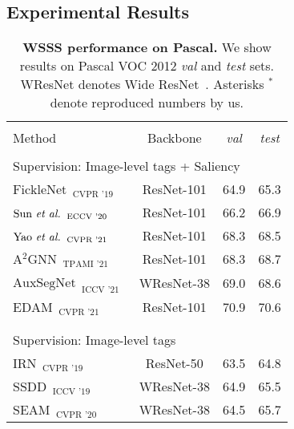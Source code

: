 \documentclass[10pt,twocolumn,letterpaper]{article}
\begin{document}
\subsection{Experimental Results}
\begin{table}[t]
\renewcommand{\arraystretch}{0.95}
\centering
  \caption{\textbf{WSSS performance on Pascal.} We show results on Pascal VOC 2012 \textit{val} and \textit{test} sets. WResNet denotes Wide ResNet~\cite{wu2019wider}. Asterisks $^*$ denote reproduced numbers by us.}\label{table_semantic}
\vspace{-0.7em}
\begin{threeparttable}
\begin{tabular}{l@{\hskip 0.1in}c@{\hskip 0.1in}cc}
    \Xhline{1pt}\\[-0.95em]
    Method  & Backbone& \textit{val} & \textit{test}\\
    \hline\hline 
    \\[-0.9em]
    
\multicolumn{3}{l}{Supervision: Image-level tags + Saliency}\\
$\text{FickleNet}_{\text{~~CVPR '19}}$~\cite{lee2019ficklenet}  & ResNet-101 & 64.9 & 65.3\\
$\text{Sun \textit{et al.}}_{\text{~~ECCV '20}}$~\cite{sun2020mining}   & ResNet-101  & 66.2  & 66.9  \\
$\text{Yao \textit{et al.}}_{\text{~~CVPR '21}}$~\cite{yao2021nonsalient}   & ResNet-101  & 68.3  & 68.5  \\
    $\text{A$^2$GNN}_{\text{~~TPAMI '21}}$~\cite{zhang2021affinity}   & ResNet-101  &   68.3 & 68.7\\
    $\text{AuxSegNet}_{\text{~~ICCV '21}}$~\cite{xu2021leveraging}    & WResNet-38 & 69.0  & 68.6 \\
$\text{EDAM}_{\text{~~CVPR '21}}$~\cite{wu2021embedded}    & ResNet-101 & 70.9  & 70.6 \\
\\[-0.9em]
\hline
    \\[-0.9em]
     \multicolumn{3}{l}{Supervision: Image-level tags}\\
    $\text{IRN}_{\text{~~CVPR '19}}$~\cite{ahn2019weakly}  &  ResNet-50 & 63.5 & 64.8 \\
    $\text{SSDD}_{\text{~~ICCV '19}}$~\cite{Shimoda_2019_ICCV}    & WResNet-38   & 64.9  & 65.5\\
    $\text{SEAM}_{\text{~~CVPR '20}}$~\cite{wang2020self}    & WResNet-38 & 64.5  & 65.7 \\



\end{tabular}
\end{threeparttable}
\end{table}
\end{document}
